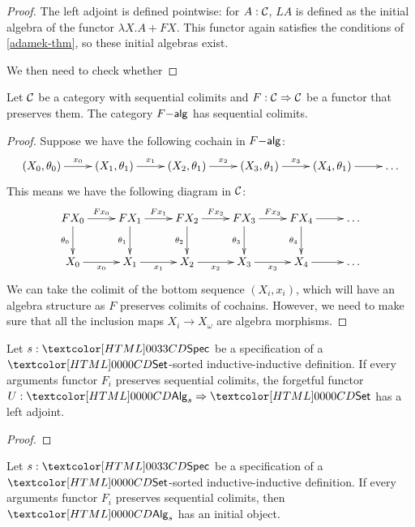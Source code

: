 \begin{proof}
  The left adjoint is defined pointwise: for $A : \mathcal{C}$, $L A$ is
  defined as the initial algebra of the functor $\lambda X . A + FX$.
  This functor again satisfies the conditions of \cref{adamek-thm}, so
  these initial algebras exist.

  We then need to check whether 
  
  
\end{proof}

\begin{proposition}
  Let $\mathcal{C}$ be a category with sequential colimits and
  $F : \mathcal{C} \Rightarrow \mathcal{C}$ be a functor that preserves them. The category
  $F\mathsf{-alg}$ has sequential colimits.
\end{proposition}

\begin{proof}
  Suppose we have the following cochain in $F\mathsf{-alg}$:
  $$
  \xymatrix{
    (X_0,\theta_0) \ar[r]^{x_0}
    &(X_1,\theta_1) \ar[r]^{x_1} 
    &(X_2,\theta_1) \ar[r]^{x_2} 
    &(X_3,\theta_1) \ar[r]^{x_3}
    &(X_4,\theta_1) \ar[r]
    &\hdots
  }
  $$
  This means we have the following diagram in $\mathcal{C}$:
  $$
  \xymatrix{
    F X_0 \ar[r]^{F x_0} \ar[d]_{\theta_0}
    &F X_1 \ar[r]^{F x_1} \ar[d]_{\theta_1}
    &F X_2 \ar[r]^{F x_2} \ar[d]_{\theta_2}
    &F X_3 \ar[r]^{F x_3} \ar[d]_{\theta_3}
    &F X_4 \ar[r] \ar[d]_{\theta_4} 
    &\hdots
    \\
    X_0 \ar[r]_{x_0}
    &X_1 \ar[r]_{x_1}
    &X_2 \ar[r]_{x_2}
    &X_3 \ar[r]_{x_3}
    &X_4 \ar[r]
    &\hdots
  }
  $$
  We can take the colimit of the bottom sequence $(X_i,x_i)$, which
  will have an algebra structure as $F$ preserves colimits of
  cochains. However, we need to make sure that all the inclusion maps
  $X_i \to X_\omega$ are algebra morphisms.
\end{proof}

\begin{proposition}
  Let $s : \specty$ be a specification of a $\Set$-sorted
  inductive-inductive definition. If every arguments functor $F_i$
  preserves sequential colimits, the forgetful functor
  $U : \Func{\Alg_s}{\Set}$ has a left adjoint.
\end{proposition}

\begin{proof}
  
\end{proof}

\begin{proposition}
  Let $s : \specty$ be a specification of a
  $\Set$-sorted inductive-inductive definition. If every arguments
  functor $F_i$ preserves sequential colimits, then
  $\Alg_s$ has an initial object.
\end{proposition}

